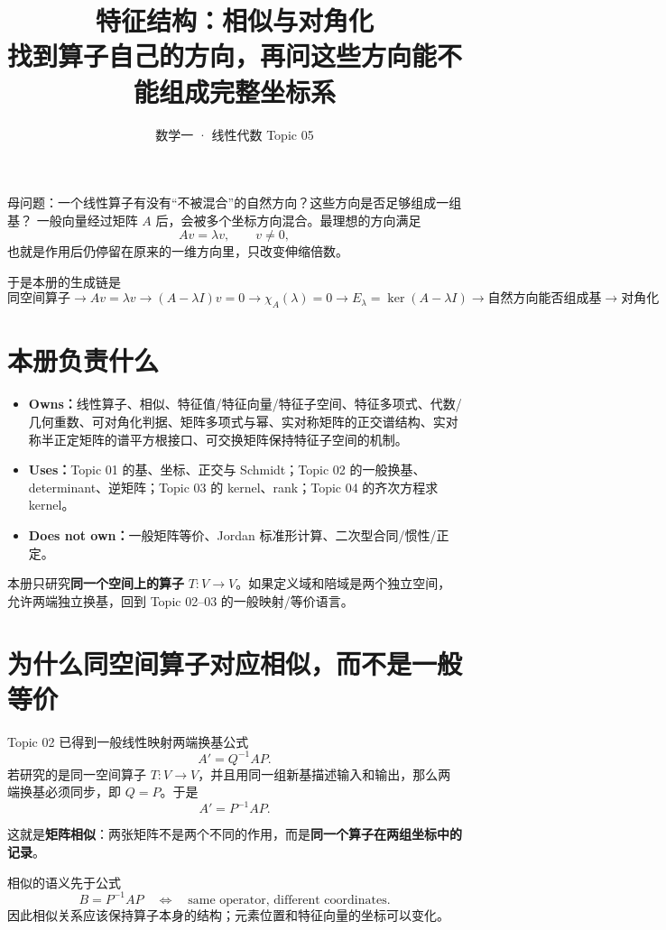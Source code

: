 \documentclass[11pt,a4paper]{ctexart}
\title{\vspace{-1.1cm}\textbf{特征结构：相似与对角化}\\[0.4em]
\large 找到算子自己的方向，再问这些方向能不能组成完整坐标系}
\author{数学一 · 线性代数 Topic 05}
\date{}
\newcommand{\kw}[1]{\textbf{\color{deep}#1}}
\begin{document}
\maketitle

\begin{corebox}{母问题：一个线性算子有没有“不被混合”的自然方向？这些方向是否足够组成一组基？}
一般向量经过矩阵 $A$ 后，会被多个坐标方向混合。最理想的方向满足
\[
Av=\lambda v,
\qquad v\neq0,
\]
也就是作用后仍停留在原来的一维方向里，只改变伸缩倍数。

于是本册的生成链是
\[
\boxed{
\text{同空间算子}
\to Av=\lambda v
\to (A-\lambda I)v=0
\to \chi_A(\lambda)=0
\to E_\lambda=\ker(A-\lambda I)
\to \text{自然方向能否组成基}
\to \text{对角化}
}
\]
\end{corebox}

\section{本册负责什么}

\begin{itemize}
  \item \kw{Owns：}线性算子、相似、特征值/特征向量/特征子空间、特征多项式、代数/几何重数、可对角化判据、矩阵多项式与幂、实对称矩阵的正交谱结构、实对称半正定矩阵的谱平方根接口、可交换矩阵保持特征子空间的机制。
  \item \kw{Uses：}Topic 01 的基、坐标、正交与 Schmidt；Topic 02 的一般换基、determinant、逆矩阵；Topic 03 的 kernel、rank；Topic 04 的齐次方程求 kernel。
  \item \kw{Does not own：}一般矩阵等价、Jordan 标准形计算、二次型合同/惯性/正定。
\end{itemize}

本册只研究\kw{同一个空间上的算子} $T:V\to V$。如果定义域和陪域是两个独立空间，允许两端独立换基，回到 Topic 02--03 的一般映射/等价语言。

\section{为什么同空间算子对应相似，而不是一般等价}

Topic 02 已得到一般线性映射两端换基公式
\[
A'=Q^{-1}AP.
\]
若研究的是同一空间算子 $T:V\to V$，并且用同一组新基描述输入和输出，那么两端换基必须同步，即 $Q=P$。于是
\[
\boxed{A'=P^{-1}AP.}
\]

这就是\kw{矩阵相似}：两张矩阵不是两个不同的作用，而是\kw{同一个算子在两组坐标中的记录}。

\begin{corebox}{相似的语义先于公式}
\[
\boxed{B=P^{-1}AP
\quad\Longleftrightarrow\quad
\text{same operator, different coordinates}.}
\]
因此相似关系应该保持算子本身的结构；元素位置和特征向量的坐标可以变化。
\end{corebox}
\end{document}
